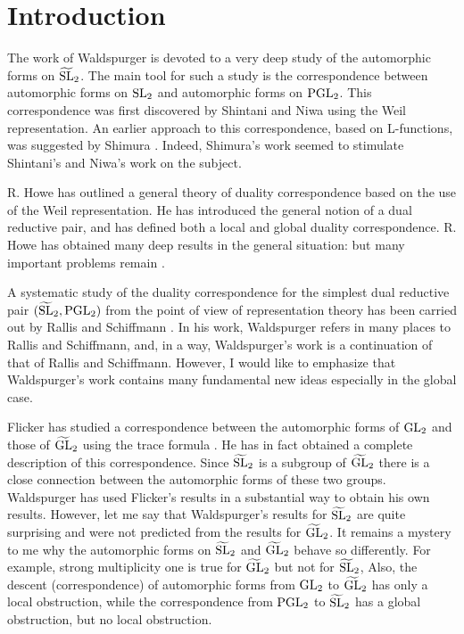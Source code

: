 \section{Introduction}
\label{sec:0}

The work of Waldspurger \cite{waldspurger78theta,waldspurger80shimura,waldspurger81demientier,waldspurger84shimura,waldspurger91quaternion} is devoted to a very deep study of the automorphic forms on $\widetilde{\mathrm{SL}}_2$.
The main tool for such a study is the correspondence between automorphic forms on $\mathrm{SL}_2$ and automorphic forms on $\mathrm{PGL}_2$.
This correspondence was first discovered by Shintani and Niwa using the Weil representation.
An earlier approach to this correspondence, based on L-functions, was suggested by Shimura \cite{shimura73half}.
Indeed, Shimura's work seemed to stimulate Shintani's and Niwa's work on the subject.

R. Howe has outlined a general theory of duality correspondence based on the use of the Weil representation. 
He has introduced the general notion of a dual reductive pair, and has defined both a local and global duality correspondence.
R. Howe has obtained many deep results in the general situation: but many important problems remain \cite{howe79theta}.

A systematic study of the duality correspondence for the simplest dual reductive pair $(\widetilde{\mathrm{SL}}_2, \mathrm{PGL}_2)$ from the point of view of representation theory has been carried out by Rallis and Schiffmann \cite{rs77metaplectic}.
In his work, Waldspurger refers in many places to Rallis and Schiffmann, and, in a way, Waldspurger's work is a continuation of that of Rallis and Schiffmann.
However, I would like to emphasize that Waldspurger's work contains many fundamental new ideas especially in the global case.

Flicker has studied a correspondence between the automorphic forms of $\mathrm{GL}_2$ and those of $\widetilde{\mathrm{GL}}_2$ using the trace formula \cite{flicker80covering}.
He has in fact obtained a complete description of this correspondence.
Since $\widetilde{\mathrm{SL}}_2$ is a subgroup of $\widetilde{\mathrm{GL}}_2$ there is a close connection between the automorphic forms of these two groups.
Waldspurger has used Flicker's results in a substantial way to obtain his own results.
However, let me say that Waldspurger's results for $\widetilde{\mathrm{SL}}_2$ are quite surprising and were not predicted from the results for $\widetilde{\mathrm{GL}}_2$.
It remains a mystery to me why the automorphic forms on $\widetilde{\mathrm{SL}}_2$ and $\widetilde{\mathrm{GL}}_2$ behave so differently.
For example, strong multiplicity one is true for $\widetilde{\mathrm{GL}}_2$ but not for $\widetilde{\mathrm{SL}}_2$,
Also, the descent (correspondence) of automorphic forms from $\mathrm{GL}_2$ to $\widetilde{\mathrm{GL}}_2$ has only a local obstruction, while the correspondence from $\mathrm{PGL}_2$ to $\widetilde{\mathrm{SL}}_2$ has a global obstruction, but no local obstruction.

